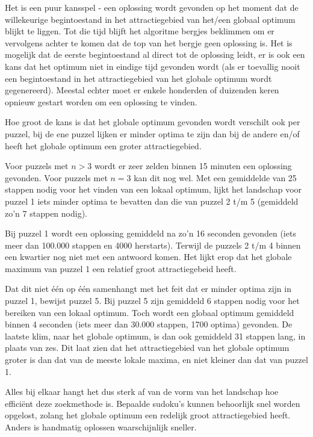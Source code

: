 \documentclass[]{report}
\begin{document}
Het is een puur kansspel - een oplossing wordt gevonden op het moment dat de willekeurige begintoestand in het attractiegebied van het/een globaal optimum blijkt te liggen. Tot die tijd blijft het algoritme bergjes beklimmen om er vervolgens achter te komen dat de top van het bergje geen oplossing is. Het is mogelijk dat de eerste begintoestand al direct tot de oplossing leidt, er is ook een kans dat het optimum niet in eindige tijd gevonden wordt (als er toevallig nooit een begintoestand in het attractiegebied van het globale optimum wordt gegenereerd). Meestal echter moet er enkele honderden of duizenden keren opnieuw gestart worden om een oplossing te vinden.

Hoe groot de kans is dat het globale optimum gevonden wordt verschilt ook per puzzel, bij de ene puzzel lijken er minder optima te zijn dan bij de andere en/of heeft het globale optimum een groter attractiegebied.

Voor puzzels met $n > 3$ wordt er zeer zelden binnen 15 minuten een oplossing gevonden. Voor puzzels met $n=3$ kan dit nog wel. Met een gemiddelde van 25 stappen nodig voor het vinden van een lokaal optimum, lijkt het landschap voor puzzel 1 iets minder optima te bevatten dan die van puzzel 2 t/m 5 (gemiddeld zo'n 7 stappen nodig).

Bij puzzel 1 wordt een oplossing gemiddeld na zo'n 16 seconden gevonden (iets meer dan 100.000 stappen en 4000 herstarts). Terwijl de puzzels 2 t/m 4 binnen een kwartier nog niet met een antwoord komen. Het lijkt erop dat het globale maximum van puzzel 1 een relatief groot attractiegebeid heeft.

Dat dit niet \'{e}\'{e}n op \'{e}\'{e}n samenhangt met het feit dat er minder optima zijn in puzzel 1, bewijst puzzel 5. Bij puzzel 5 zijn gemiddeld 6 stappen nodig voor het bereiken van een lokaal optimum. Toch wordt een globaal optimum gemiddeld binnen 4 seconden (iets meer dan 30.000 stappen, 1700 optima) gevonden. De laatste klim, naar het globale optimum, is dan ook gemiddeld 31 stappen lang, in plaats van zes. Dit laat zien dat het attractiegebied van het globale optimum groter is dan dat van de meeste lokale maxima, en niet kleiner dan dat van puzzel 1.

Alles bij elkaar hangt het dus sterk af van de vorm van het landschap hoe effici\"{e}nt deze zoekmethode is. Bepaalde sudoku's kunnen behoorlijk snel worden opgelost, zolang het globale optimum een redelijk groot attractiegebied heeft. Anders is handmatig oplossen waarschijnlijk sneller.
\end{document}
